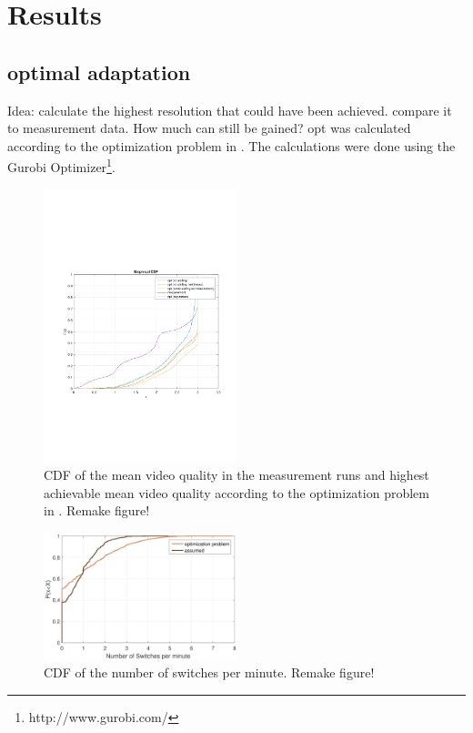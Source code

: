 
\section{Results}
\label{sec:results}


\subsection{optimal adaptation}

Idea: calculate the highest resolution that could have been achieved. compare it to measurement data. How much can still be gained?
opt was calculated according to the optimization problem in \cite{hossfeld2015identifying}. The calculations were done using the Gurobi Optimizer\footnote{http://www.gurobi.com/}.

\begin{figure}[t]
\centering
\includegraphics[width=0.5\textwidth]{figs/quality}%
\caption{CDF of the mean video quality in the measurement runs and highest achievable mean video quality according to the optimization problem in \cite{hossfeld2015identifying}. Remake figure!}
\label{fig:opt}%
\end{figure}

\begin{figure}[t]
\centering
\includegraphics[width=0.5\textwidth]{figs/switches}%
\caption{CDF of the number of switches per minute. Remake figure!}
\label{fig:switches}%
\end{figure}

